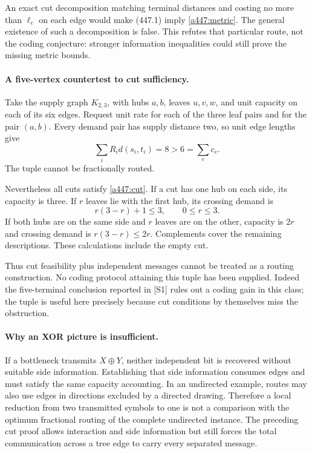 \documentclass[11pt]{article}
\begin{document}
An exact cut decomposition matching terminal distances and costing no more than $\ell_e$ on each edge would make (447.1) imply \eqref{a447:metric}. The general existence of such a decomposition is false. This refutes that particular route, not the coding conjecture: stronger information inequalities could still prove the missing metric bounds.

\paragraph{A five-vertex countertest to cut sufficiency.}
Take the supply graph $K_{2,3}$, with hubs $a,b$, leaves $u,v,w$, and unit capacity on each of its six edges. Request unit rate for each of the three leaf pairs and for the pair $(a,b)$. Every demand pair has supply distance two, so unit edge lengths give
\[
 \sum_iR_i d(s_i,t_i)=8>6=\sum_ec_e.
\]
The tuple cannot be fractionally routed.

Nevertheless all cuts satisfy \eqref{a447:cut}. If a cut has one hub on each side, its capacity is three. If $r$ leaves lie with the first hub, its crossing demand is
\[
 r(3-r)+1\le3,\qquad 0\le r\le3.
\]
If both hubs are on the same side and $r$ leaves are on the other, capacity is $2r$ and crossing demand is $r(3-r)\le2r$. Complements cover the remaining descriptions. These calculations include the empty cut.

Thus cut feasibility plus independent messages cannot be treated as a routing construction. No coding protocol attaining this tuple has been supplied. Indeed the five-terminal conclusion reported in [S1] rules out a coding gain in this class; the tuple is useful here precisely because cut conditions by themselves miss the obstruction.

\paragraph{Why an XOR picture is insufficient.}
If a bottleneck transmits $X\oplus Y$, neither independent bit is recovered without suitable side information. Establishing that side information consumes edges and must satisfy the same capacity accounting. In an undirected example, routes may also use edges in directions excluded by a directed drawing. Therefore a local reduction from two transmitted symbols to one is not a comparison with the optimum fractional routing of the complete undirected instance. The preceding cut proof allows interaction and side information but still forces the total communication across a tree edge to carry every separated message.
\end{document}
